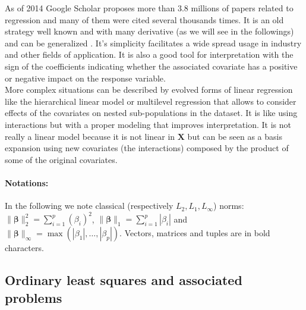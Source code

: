 \documentclass[12pt,a4paper]{report}
\begin{document}
		 As of 2014 Google Scholar proposes more than $3.8$ millions of papers related to regression and many of them were cited several thousands times. It is an old strategy well known and with many derivative (as we will see in the followings) and can be generalized 		 \cite{kiebel2003general,wickens2004general,nelder1972generalized,mccullagh1989generalized}. 
	It's simplicity facilitates a wide spread usage in industry and other fields of application. It is also a good tool for interpretation with the sign of the coefficients indicating whether the associated covariate has a positive or negative impact on the response variable. \\
	
	More complex situations can be described by evolved forms of linear regression like the hierarchical linear model \cite{raudenbush2002hierarchical,woltman2012introduction}  or  multilevel regression \cite{moerbeek2003comparison,maas2004robustness,hox1998multilevel} that allows to consider effects of the covariates on nested sub-populations in the dataset. It is like using interactions but with a proper modeling that improves interpretation. It is not really a linear model because it is not linear in $\boldsymbol{X}$ but can be seen as a basis expansion using new covariates (the interactions) composed by the product of some of the original covariates.
%			
%



\paragraph{Notations:}	
In the following we note classical (respectively $L_2,L_1,L_{\infty}$) norms: $\parallel\boldsymbol{\beta}\parallel_2^2=\sum_{i=1}^p(\beta_i)^2$, $\parallel\boldsymbol{\beta} \parallel_1=\sum_{i=1}^p|\beta_i| $ and $\parallel\boldsymbol{\beta} \parallel_{\infty}=\operatorname{max}(|\beta_1|,\dots,|\beta_p|)$. Vectors, matrices and tuples are in bold characters.
	\subsection{Ordinary least squares and associated problems}\label{sectionOLS}		%
\end{document}
